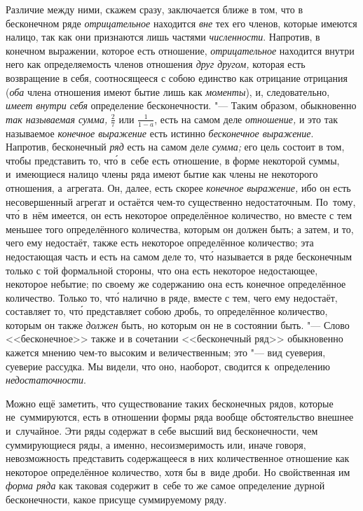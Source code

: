 Различие между ними, скажем сразу, заключается ближе в том, что в бесконечном
ряде {\em отрицательное} находится {\em вне} тех его членов, которые имеются
налицо, так как они признаются лишь частями {\em численности}. Напротив, в
конечном выражении, которое есть отношение, {\em отрицательное} находится
внутри него как определяемость членов отношения {\em друг другом,} которая есть
возвращение в себя, соотносящееся с собою единство как отрицание отрицания
({\em оба} члена отношения имеют бытие лишь как {\em моменты}), и,
следовательно, {\em имеет внутри себя} определение бесконечности. "--- Таким
образом, обыкновенно {\em так называемая сумма,} $\frac 2 7$ или
$\frac 1{1-a}$, есть на самом деле {\em отношение,} и это так называемое
{\em конечное выражение} есть истинно {\em бесконечное выражение}. Напротив,
бесконечный {\em ряд} есть на самом деле {\em сумма;} его цель состоит в том,
чтобы представить то, чт\'{о} в~себе есть отношение, в форме некоторой суммы,
и~имеющиеся налицо члены ряда имеют бытие как члены не некоторого отношения,
а~агрегата. Он, далее, есть скорее {\em конечное выражение,} ибо он есть
несовершенный агрегат и остаётся чем-то существенно недостаточным. По~тому,
чт\'{о} в~нём имеется, он есть некоторое определённое количество, но вместе
с тем меньшее того определённого количества, которым он должен быть; а затем,
и то, чего ему недостаёт, также есть некоторое определённое количество; эта
недостающая часть и есть на самом деле то, чт\'{о} называется в ряде
бесконечным только с той формальной стороны, что она есть некоторое
недостающее, некоторое небытие; по своему же содержанию она есть конечное
определённое количество. Только то, чт\'{о} налично в ряде, вместе с тем, чего
ему недостаёт, составляет то, чт\'{о} представляет собою дробь, то определённое
количество, которым он также {\em должен} быть, но которым он не в состоянии
быть. "--- Слово <<бесконечное>> также и в сочетании <<бесконечный ряд>>
обыкновенно кажется мнению чем-то высоким и величественным; это "--- вид
суеверия, суеверие рассудка. Мы видели, что оно, наоборот, сводится
к~определению {\em недостаточности}.

Можно ещё заметить, что существование таких бесконечных рядов, которые
не~суммируются, есть в отношении формы ряда вообще обстоятельство внешнее
и~случайное. Эти ряды содержат в себе высший вид бесконечности, чем
суммирующиеся ряды, а именно, несоизмеримость или, иначе говоря, невозможность
представить содержащееся в них количественное отношение как некоторое
определённое количество, хотя бы в~виде дроби. Но свойственная им
{\em форма ряда} как таковая содержит в~себе то же самое определение дурной
бесконечности, какое присуще суммируемому ряду.

